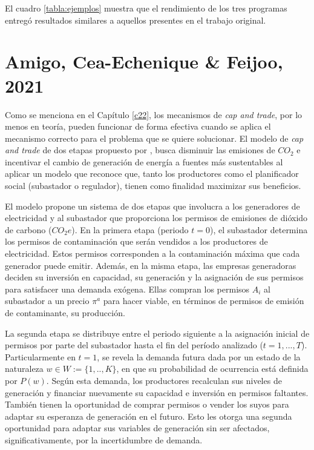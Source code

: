 El cuadro \ref{tabla:ejemplos} muestra que el rendimiento de los tres programas entregó resultados similares a aquellos presentes en el trabajo original.



\section{Amigo, Cea-Echenique \& Feijoo, 2021}

Como se menciona en el Capítulo \ref{c22}, los mecanismos de \textit{cap and trade}, por lo menos en teoría, pueden funcionar de forma efectiva cuando se aplica el mecanismo correcto para el problema que se quiere solucionar. El modelo de \textit{cap and trade} de dos etapas propuesto por , busca disminuir las emisiones de $CO_2$ e incentivar el cambio de generación de energía a fuentes más sustentables al aplicar un modelo que reconoce que, tanto los productores como el planificador social (subastador o regulador), tienen como finalidad maximizar sus beneficios.
\vspace{2.5mm}

El modelo propone un sistema de dos etapas que involucra a los generadores de electricidad y al subastador que proporciona los permisos de emisiones de dióxido de carbono ($CO_2 e$). En la primera etapa (periodo $t=0$), el subastador determina los permisos de contaminación que serán vendidos a los productores de electricidad. Estos permisos corresponden a la contaminación máxima que cada generador puede emitir. Además, en la misma etapa, las empresas generadoras deciden su inversión en capacidad, su generación y la asignación de sus permisos para satisfacer una demanda exógena. Ellas compran los permisos $A_i$ al subastador a un precio $\pi^a$ para hacer viable, en términos de permisos de emisión de contaminante, su producción. 
\vspace{2.5mm}

La segunda etapa se distribuye entre el periodo siguiente a la asignación inicial de permisos por parte del subastador hasta el fin del período analizado ($t=1,...,T$). Particularmente en $t=1$,  se revela la demanda futura dada por un estado de la naturaleza $w \in W :=\{ 1,..,K\}$, en que su probabilidad de ocurrencia está definida por $P(w)$. Según esta demanda, los productores recalculan sus niveles de generación y financiar nuevamente su capacidad e inversión en permisos faltantes. También tienen la oportunidad de comprar permisos o vender los suyos para adaptar su esperanza de generación en el futuro. Esto les otorga una segunda oportunidad para adaptar sus variables de generación sin ser afectados, significativamente, por la incertidumbre de demanda.
\vspace{2.5mm}

